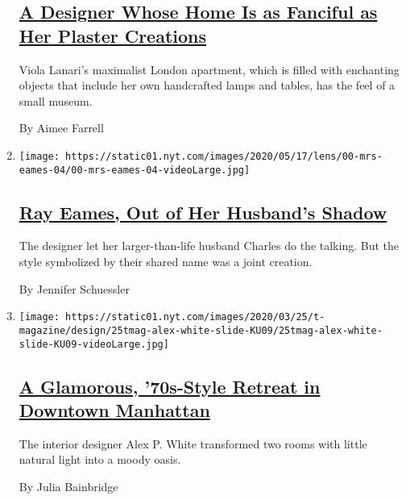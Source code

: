 \begin{enumerate}
{  \subsection{\texorpdfstring{\href{/2020/04/09/t-magazine/viola-lanari.html}{A
  Designer Whose Home Is as Fanciful as Her Plaster
  Creations}}{A Designer Whose Home Is as Fanciful as Her Plaster Creations}}\label{a-designer-whose-home-is-as-fanciful-as-her-plaster-creations}}

  Viola Lanari's maximalist London apartment, which is filled with
  enchanting objects that include her own handcrafted lamps and tables,
  has the feel of a small museum.

  By Aimee Farrell
\item
  \texttt{[image: https://static01.nyt.com/images/2020/05/17/lens/00-mrs-eames-04/00-mrs-eames-04-videoLarge.jpg]}

  \hypertarget{ray-eames-out-of-her-husbands-shadow}{%
  \subsection{\texorpdfstring{\href{/2020/05/15/arts/ray-charles-eames-artists.html}{Ray
  Eames, Out of Her Husband's
  Shadow}}{Ray Eames, Out of Her Husband's Shadow}}\label{ray-eames-out-of-her-husbands-shadow}}

  The designer let her larger-than-life husband Charles do the talking.
  But the style symbolized by their shared name was a joint creation.

  By Jennifer Schuessler
\item
  \texttt{[image: https://static01.nyt.com/images/2020/03/25/t-magazine/design/25tmag-alex-white-slide-KU09/25tmag-alex-white-slide-KU09-videoLarge.jpg]}

  \hypertarget{a-glamorous-70s-style-retreat-in-downtown-manhattan}{%
  \subsection{\texorpdfstring{\href{/2020/03/26/t-magazine/downtown-manhattan-apartment-alex-p-white.html}{A
  Glamorous, '70s-Style Retreat in Downtown
  Manhattan}}{A Glamorous, '70s-Style Retreat in Downtown Manhattan}}\label{a-glamorous-70s-style-retreat-in-downtown-manhattan}}

  The interior designer Alex P. White transformed two rooms with little
  natural light into a moody oasis.

  By Julia Bainbridge
\end{enumerate}

